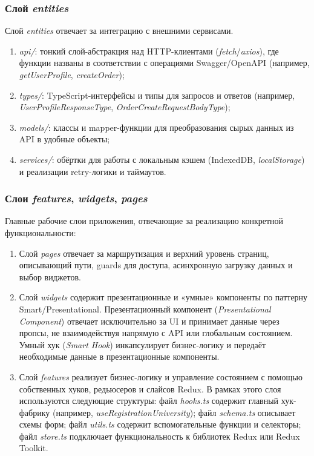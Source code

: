 \subsubsection{Слой \textit{entities}}

Слой \textit{entities} отвечает за интеграцию с внешними сервисами.
\begin{enumerate}
  \item \textit{api/}: тонкий слой-абстракция над HTTP-клиентами (\textit{fetch}/\textit{axios}), где функции названы в соответствии с операциями Swagger/OpenAPI (например, \textit{getUserProfile}, \textit{createOrder});
  \item \textit{types/}: TypeScript-интерфейсы и типы для запросов и ответов (например, \textit{UserProfileResponseType}, \textit{OrderCreateRequestBodyType});
  \item \textit{models/}: классы и mapper-функции для преобразования сырых данных из API в удобные объекты;
  \item \textit{services/}: обёртки для работы с локальным кэшем (IndexedDB, \textit{localStorage}) и реализации retry-логики и таймаутов.
\end{enumerate}

\subsubsection{Слои \textit{features}, \textit{widgets}, \textit{pages}}

Главные рабочие слои приложения, отвечающие за реализацию конкретной функциональности:
\begin{enumerate}
  \item Слой \textit{pages} отвечает за маршрутизация и верхний уровень страниц, описывающий пути, guards для доступа, асинхронную загрузку данных и выбор виджетов.
  \item Слой \textit{widgets} содержит презентационные и «умные» компоненты по паттерну Smart/Presentational. Презентационный компонент (\textit{Presentational Component}) отвечает исключительно за UI и принимает данные через пропсы, не взаимодействуя напрямую с API или глобальным состоянием. Умный хук (\textit{Smart Hook}) инкапсулирует бизнес-логику и передаёт необходимые данные в презентационные компоненты.
  \item Слой \textit{features} реализует бизнес-логику и управление состоянием с помощью собственных хуков, редьюсеров и слайсов Redux. В рамках этого слоя используются следующие структуры: файл \textit{hooks.ts} содержит главный хук-фабрику (например, \textit{useRegistrationUniversity}); файл \textit{schema.ts} описывает схемы форм; файл \textit{utils.ts} содержит вспомогательные функции и селекторы; файл \textit{store.ts} подключает функциональность к библиотек Redux или Redux Toolkit.
\end{enumerate}

